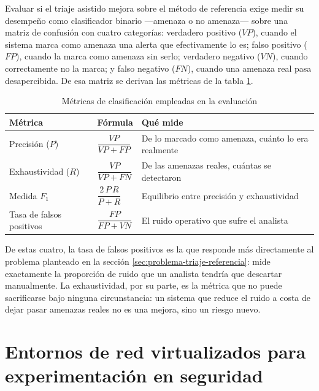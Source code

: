 Evaluar si el triaje asistido mejora sobre el método de referencia exige medir su desempeño como
clasificador binario ---amenaza o no amenaza--- sobre una matriz de confusión con cuatro categorías:
verdadero positivo ($VP$), cuando el sistema marca como amenaza una alerta que efectivamente lo es;
falso positivo ($FP$), cuando la marca como amenaza sin serlo; verdadero negativo ($VN$), cuando
correctamente no la marca; y falso negativo ($FN$), cuando una amenaza real pasa desapercibida. De
esa matriz se derivan las métricas de la tabla \ref{tab:metricas-clasificacion}.

\begin{table}[H]
  \centering
  \caption{Métricas de clasificación empleadas en la evaluación}
  \label{tab:metricas-clasificacion}
  \begin{tabular}{@{}p{}p{}p{}@{}}
    \toprule
    \textbf{Métrica} & \textbf{Fórmula} & \textbf{Qué mide} \\
    \midrule
    Precisión ($P$) & $\dfrac{VP}{VP+FP}$ & De lo marcado como amenaza, cuánto lo era realmente \\
    Exhaustividad ($R$) & $\dfrac{VP}{VP+FN}$ & De las amenazas reales, cuántas se detectaron \\
    Medida $F_1$ & $\dfrac{2\,P\,R}{P+R}$ & Equilibrio entre precisión y exhaustividad \\
    Tasa de falsos positivos & $\dfrac{FP}{FP+VN}$ & El ruido operativo que sufre el analista \\
    \bottomrule
  \end{tabular}
\end{table}

De estas cuatro, la tasa de falsos positivos es la que responde más directamente al problema
planteado en la sección \ref{sec:problema-triaje-referencia}: mide exactamente la proporción de
ruido que un analista tendría que descartar manualmente. La exhaustividad, por su parte, es la
métrica que no puede sacrificarse bajo ninguna circunstancia: un sistema que reduce el ruido a costa
de dejar pasar amenazas reales no es una mejora, sino un riesgo nuevo.

\section{Entornos de red virtualizados para experimentación en seguridad}

